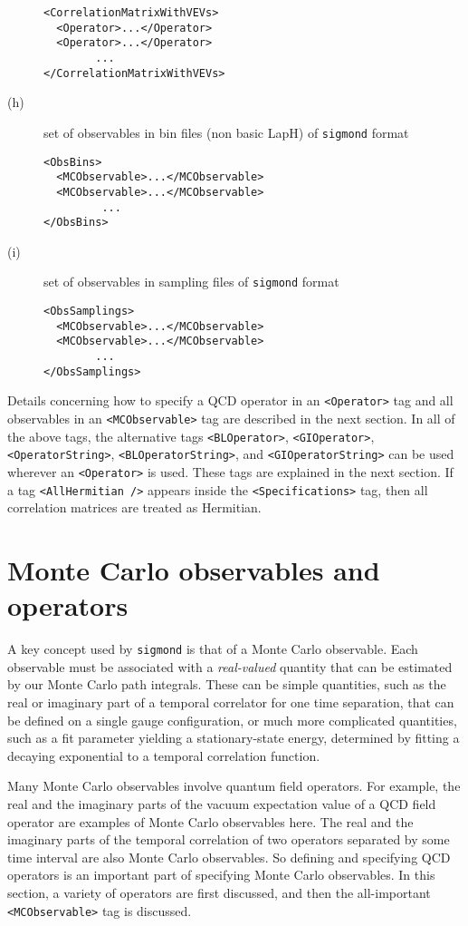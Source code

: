 \documentclass[12pt]{article}
\newcommand{\vb}{\texttt}
\begin{document}
\begin{description}
\begin{verbatim}
<CorrelationMatrixWithVEVs>
  <Operator>...</Operator>
  <Operator>...</Operator>
        ...
</CorrelationMatrixWithVEVs>
\end{verbatim}
\item[(h)]
  set of observables in bin files (non basic LapH) of \vb{sigmond} format
\begin{verbatim}
<ObsBins>
  <MCObservable>...</MCObservable>
  <MCObservable>...</MCObservable>
         ...
</ObsBins>
\end{verbatim}
\item[(i)]
  set of observables in sampling files of \vb{sigmond} format
\begin{verbatim}
<ObsSamplings>
  <MCObservable>...</MCObservable>
  <MCObservable>...</MCObservable>
        ...
</ObsSamplings>
\end{verbatim}
\end{description}

Details concerning how to specify a QCD operator in an \vb{<Operator>}
tag and all observables in an \vb{<MCObservable>} tag are described in the
next section.  In all of the above tags, the alternative tags \vb{<BLOperator>},
\vb{<GIOperator>}, \vb{<OperatorString>}, \vb{<BLOperatorString>}, and
\vb{<GIOperatorString>} can be used wherever an \vb{<Operator>} is used.
These tags are explained in the next section.
If a tag \vb{<AllHermitian />} appears inside the \vb{<Specifications>}
tag, then all correlation matrices are treated as Hermitian.

\section{Monte Carlo observables and operators}

A key concept used by \vb{sigmond} is that of a Monte Carlo observable.
Each observable must be associated with a \textit{real-valued} quantity that
can be estimated by our Monte Carlo path integrals.  These can be simple
quantities, such as the real or imaginary part of a temporal correlator for
one time separation, that can be defined on a single gauge configuration,
or much more complicated quantities, such as a fit parameter yielding a
stationary-state energy, determined by fitting a decaying exponential to a
temporal correlation function.

Many Monte Carlo observables involve quantum field operators.  For example,
the real and the imaginary parts of the vacuum expectation value of a QCD
field operator are examples of Monte Carlo observables here.  The real
and the imaginary parts of the temporal correlation of two operators
separated by some time interval are also Monte Carlo observables.  So
defining and specifying QCD operators is an important part of specifying
Monte Carlo observables.  In this section, a variety of operators are
first discussed, and then the all-important \vb{<MCObservable>} tag is
discussed.
\end{document}
